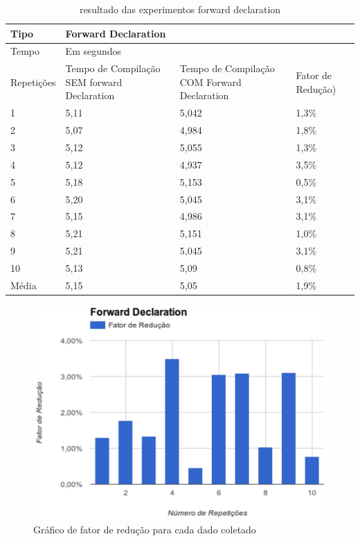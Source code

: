 \begin{table}[h]
\centering
\begin{tabular}{|l|p{3cm}|p{3cm}|p{3cm}|}
\hline
Tipo       & \multicolumn{3}{l|}{Forward Declaration}                                                                                                                            \\ \hline
Tempo      & \multicolumn{3}{l|}{Em segundos}                                                                                                                                    \\ \hline
Repetições & Tempo de Compilação SEM forward Declaration & Tempo de Compilação COM Forward Declaration & Fator de Redução) \\ \hline
1      & 5,11  & 5,042 & 1,3\% \\ \hline
2      & 5,07  & 4,984 & 1,8\% \\ \hline
3      & 5,12  & 5,055 & 1,3\% \\ \hline
4      & 5,12  & 4,937 & 3,5\% \\ \hline
5      & 5,18  & 5,153 & 0,5\% \\ \hline
6      & 5,20  & 5,045 & 3,1\% \\ \hline
7      & 5,15  & 4,986 & 3,1\% \\ \hline
8      & 5,21  & 5,151 & 1,0\% \\ \hline
9      & 5,21  & 5,045 & 3,1\% \\ \hline
10     & 5,13  & 5,09  & 0,8\% \\ \hline
Média  & 5,15  & 5,05  & 1,9\% \\ \hline
\end{tabular}
\caption{resultado das experimentos forward declaration}
\label{experimento_02}
\end{table}


\begin{figure}[h]
    \centering
        \includegraphics[keepaspectratio=true,scale=1]{figuras/forward_declaration.eps}
    \caption{Gráfico de fator de redução para cada dado coletado}
    \label{grafico_forward_declaration}
\end{figure}



